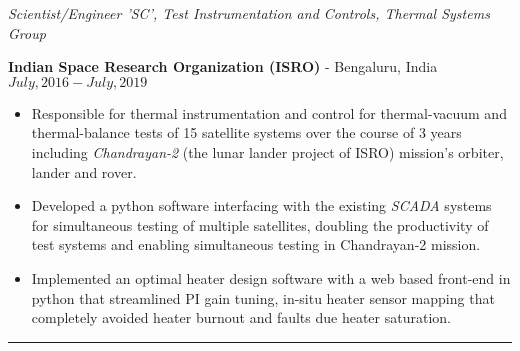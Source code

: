 \medskip

\noindent\textit{Scientist/Engineer 'SC', Test Instrumentation and Controls, Thermal Systems Group}

\textbf{Indian Space Research Organization (ISRO)} - Bengaluru, India \hfill $July, 2016 - July, 2019$

\begin{itemize}
        \item Responsible for thermal instrumentation and control for thermal-vacuum and thermal-balance tests of 15 satellite systems over the course of 3 years including \textit{Chandrayan-2} (the lunar lander project of ISRO) mission's orbiter, lander and rover.
        \item Developed a python software interfacing with the existing \textit{SCADA} systems for simultaneous testing of multiple satellites, doubling the productivity of test systems and enabling simultaneous testing in Chandrayan-2 mission.
	\item Implemented an optimal heater design software with a web based front-end in python that streamlined PI gain tuning, in-situ heater sensor mapping that completely avoided heater burnout and faults due heater saturation.
\end{itemize}
\noindent\rule{\textwidth}{0.4pt}
